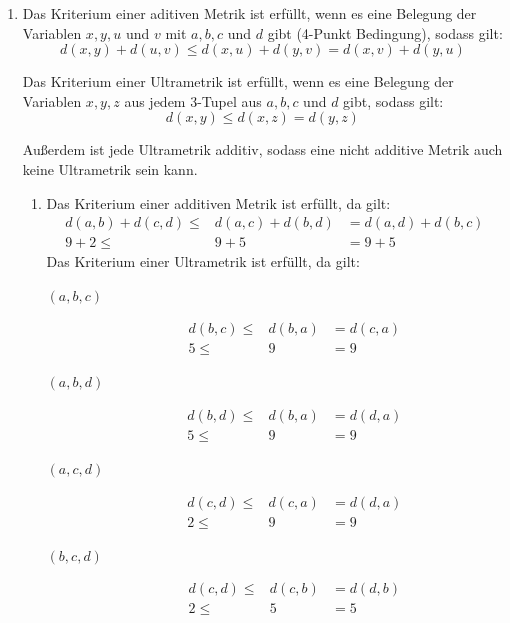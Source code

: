 \documentclass{homework}
\date{Montag, dem 5. November 2012}
\author{Stefan Meißner (4279113) und Niels Hoppe (4356370)}
\begin{document}
\maketitle
\begin{enumerate} 

\begin{enumerate}
\item Das Kriterium einer aditiven Metrik ist erfüllt, wenn es eine Belegung der
Variablen $x, y, u$ und $v$ mit $a, b, c$ und $d$ gibt (4-Punkt Bedingung), sodass gilt:
$$d(x,y) + d(u,v) \leq d(x,u) + d(y,v) = d(x,v) + d(y,u)$$

Das Kriterium einer Ultrametrik ist erfüllt, wenn es eine Belegung der Variablen
$x, y, z$ aus jedem 3-Tupel aus $a, b, c$ und $d$ gibt, sodass gilt:
$$d(x,y) \leq d(x,z) = d(y,z)$$

Außerdem ist jede Ultrametrik additiv, sodass eine nicht additive Metrik auch
keine Ultrametrik sein kann.

\begin{enumerate}
\item Das Kriterium einer additiven Metrik ist erfüllt, da gilt:
\begin{eqnarray*}
d(a,b) + d(c,d) \leq & d(a,c) + d(b,d) & = d(a,d) + d(b,c)\\
9 + 2 \leq & 9 + 5 & = 9 + 5
\end{eqnarray*}
Das Kriterium einer Ultrametrik ist erfüllt, da gilt:
\begin{description}
\item[$(a,b,c)$] \begin{eqnarray*}
d(b,c) \leq & d(b,a) & = d(c,a)\\
5 \leq & 9 & = 9
\end{eqnarray*}
\item[$(a,b,d)$] \begin{eqnarray*}
d(b,d) \leq & d(b,a) & = d(d,a)\\
5 \leq & 9 & = 9
\end{eqnarray*}
\item[$(a,c,d)$] \begin{eqnarray*}
d(c,d) \leq & d(c,a) & = d(d,a)\\
2 \leq & 9 & = 9
\end{eqnarray*}
\item[$(b,c,d)$] \begin{eqnarray*}
d(c,d) \leq & d(c,b) & = d(d,b)\\
2 \leq & 5 & = 5
\end{eqnarray*}
\end{description}


\end{enumerate}
\end{enumerate}
\end{enumerate}
\end{document}

